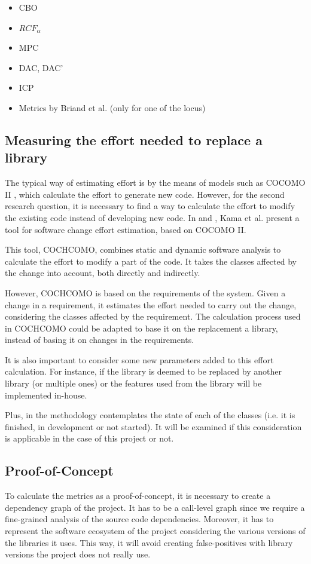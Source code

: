 \begin{itemize} %
    \item CBO
    \item $RCF_\alpha$
    \item MPC
    \item DAC, DAC'
    \item ICP
    \item Metrics by Briand et al. (only for one of the locus)
\end{itemize}

\subsection{Measuring the effort needed to replace a library}
The typical way of estimating effort is by the means of models such as COCOMO II \cite{sharma2011analysis}, which calculate the effort to generate new code. However, for the second research question, it is necessary to find a way to calculate the effort to modify the existing code instead of developing new code. In \cite{kama2014cochcomo} and \cite{asl2013change}, Kama et al. present a tool for software change effort estimation, based on COCOMO II.

This tool, COCHCOMO, combines static and dynamic software analysis to calculate the effort to modify a part of the code. It takes the classes affected by the change into account, both directly and indirectly.

However, COCHCOMO is based on the requirements of the system. Given a change in a requirement, it estimates the effort needed to carry out the change, considering the classes affected by the requirement. The calculation process used in COCHCOMO could be adapted to base it on the replacement a library, instead of basing it on changes in the requirements.

It is also important to consider some new parameters added to this effort calculation. For instance, if the library is deemed to be replaced by another library (or multiple ones) or the features used from the library will be implemented in-house.

Plus, in \cite{kama2014cochcomo} the methodology contemplates the state of each of the classes (i.e. it is finished, in development or not started). It will be examined if this consideration is applicable in the case of this project or not.

\subsection{Proof-of-Concept}
To calculate the metrics as a proof-of-concept, it is necessary to create a dependency graph of the project. It has to be a call-level graph since we require a fine-grained analysis of the source code dependencies. Moreover, it has to represent the software ecosystem of the project considering the various versions of the libraries it uses. This way, it will avoid creating false-positives with library versions the project does not really use.

